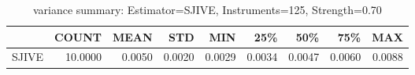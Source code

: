 \begin{table}[ht]
\centering
\caption{variance summary: Estimator=SJIVE, Instruments=125, Strength=0.70}
\begin{tabular}{lrrrrrrrr}
\toprule
 & COUNT & MEAN & STD & MIN & 25\% & 50\% & 75\% & MAX \\
\midrule
SJIVE & 10.0000 & 0.0050 & 0.0020 & 0.0029 & 0.0034 & 0.0047 & 0.0060 & 0.0088 \\
\bottomrule
\end{tabular}
\end{table}
